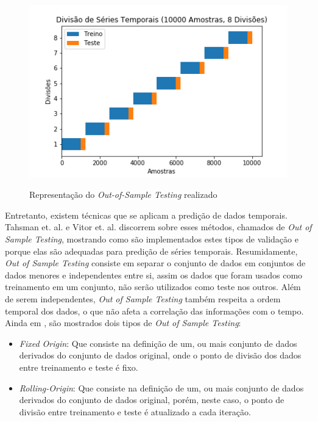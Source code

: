 \begin{figure}[htbp]
    \centering
    \includegraphics[scale=0.9]{monography/img/methods/blocking_cv.png}
    \label{figure:blocking}
    \caption[Representação do \textit{Out-of-Sample Testing} realizado]{Representação do \textit{Out-of-Sample Testing} realizado}
\end{figure}

Entretanto, existem técnicas que se aplicam a predição de dados temporais. Tahsman et. al. \cite{Tashman_2000} e Vitor et. al. \cite{Vitor_2019} discorrem sobre esses métodos, chamados de \textit{Out of Sample Testing}, mostrando como são implementados estes tipos de validação e porque elas são adequadas para predição de séries temporais. Resumidamente, \textit{Out of Sample Testing} consiste em separar o conjunto de dados em conjuntos de dados menores e independentes entre si, assim os dados que foram usados como treinamento em um conjunto, não serão utilizados como teste nos outros. Além de serem independentes, \textit{Out of Sample Testing} também respeita a ordem temporal dos dados, o que não afeta a correlação das informações com o tempo. Ainda em \cite{Tashman_2000}, são mostrados dois tipos de \textit{Out of Sample Testing}:

\begin{itemize}
    \item \textit{Fixed Origin}: Que consiste na definição de um, ou mais conjunto de dados derivados do conjunto de dados original, onde o ponto de divisão dos dados entre treinamento e teste é fixo.
    \item \textit{Rolling-Origin}: Que consiste na definição de um, ou mais conjunto de dados derivados do conjunto de dados original, porém, neste caso, o ponto de divisão entre treinamento e teste é atualizado a cada iteração.
\end{itemize}

